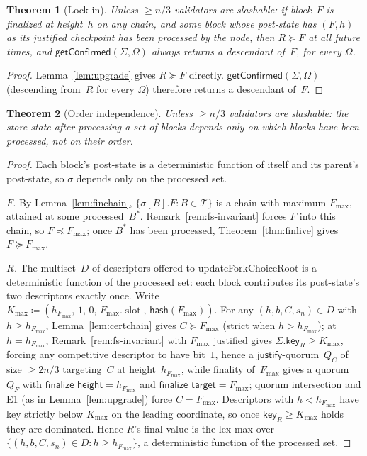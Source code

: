 \documentclass{article}
\newcommand{\T}[0]{\ensuremath{\mathcal{T}}}
\newcommand{\slot}[0]{\ensuremath{\operatorname{\mathrm{slot}}}}
\newcommand{\just}{\ensuremath{\mathsf{justify}}\xspace}
\newcommand{\finalizeHeight}{\mathsf{finalize\_height}}
\newcommand{\finalizeTarget}{\mathsf{finalize\_target}}
\newcommand{\hash}{\mathsf{hash}}
\newcommand{\key}{\mathsf{key}}
\newcommand{\updateForkChoiceRoot}{\textsf{updateForkChoiceRoot}\xspace}
\newcommand{\getConfirmed}{\textsf{getConfirmed}\xspace}
\theoremstyle{plain}
\newtheorem{theorem}{Theorem}
\theoremstyle{definition}
\theoremstyle{remark}
\begin{document}
\begin{theorem}[Lock-in]\label{thm:lockin}
Unless $\geq n/3$ validators are slashable: if block~$F$ is finalized at height~$h$ on any chain, and some block whose post-state has $(F, h)$ as its justified checkpoint has been processed by the node, then $R \succeq F$ at all future times, and $\getConfirmed(\Sigma, \Omega)$ always returns a descendant of~$F$, for every $\Omega$.
\end{theorem}

\begin{proof}
Lemma~\ref{lem:upgrade} gives $R \succeq F$ directly.
$\getConfirmed(\Sigma, \Omega)$ (descending from~$R$ for every $\Omega$) therefore returns a descendant of~$F$.
\end{proof}

\begin{theorem}[Order independence]\label{thm:orderindep}
Unless $\geq n/3$ validators are slashable: the store state after processing a set of blocks depends only on which blocks have been processed, not on their order.
\end{theorem}

\begin{proof}
Each block's post-state is a deterministic function of itself and its parent's post-state, so $\sigma$ depends only on the processed set.

\emph{$F$.} By Lemma~\ref{lem:finchain}, $\{\sigma[B].F : B \in \T\}$ is a chain with maximum $F_{\max}$, attained at some processed~$B^\ast$.
Remark~\ref{rem:fs-invariant} forces $F$ into this chain, so $F \preceq F_{\max}$; once $B^\ast$ has been processed, Theorem~\ref{thm:finlive} gives $F \succeq F_{\max}$.

\emph{$R$.} The multiset~$D$ of descriptors offered to \updateForkChoiceRoot is a deterministic function of the processed set: each block contributes its post-state's two descriptors exactly once.
Write $K_{\max} \coloneqq (h_{F_{\max}},\, 1,\, 0,\, F_{\max}.\slot,\, \hash(F_{\max}))$.
For any $(h, b, C, s_n) \in D$ with $h \geq h_{F_{\max}}$, Lemma~\ref{lem:certchain} gives $C \succeq F_{\max}$ (strict when $h > h_{F_{\max}}$); at $h = h_{F_{\max}}$, Remark~\ref{rem:fs-invariant} with $F_{\max}$ justified gives $\Sigma.\key_R \geq K_{\max}$, forcing any competitive descriptor to have bit~$1$, hence a \just-quorum~$Q_C$ of size $\geq 2n/3$ targeting~$C$ at height~$h_{F_{\max}}$, while finality of~$F_{\max}$ gives a quorum~$Q_F$ with $\finalizeHeight = h_{F_{\max}}$ and $\finalizeTarget = F_{\max}$; quorum intersection and E1 (as in Lemma~\ref{lem:upgrade}) force $C = F_{\max}$.
Descriptors with $h < h_{F_{\max}}$ have key strictly below $K_{\max}$ on the leading coordinate, so once $\key_R \geq K_{\max}$ holds they are dominated.
Hence $R$'s final value is the lex-max over $\{(h, b, C, s_n) \in D : h \geq h_{F_{\max}}\}$, a deterministic function of the processed set.
\end{proof}
\end{document}
